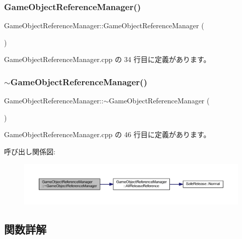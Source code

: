 \subsubsection{\texorpdfstring{Game\+Object\+Reference\+Manager()}{GameObjectReferenceManager()}}
{\footnotesize\ttfamily Game\+Object\+Reference\+Manager\+::\+Game\+Object\+Reference\+Manager (\begin{DoxyParamCaption}{ }\end{DoxyParamCaption})}



 Game\+Object\+Reference\+Manager.\+cpp の 34 行目に定義があります。

\mbox{\label{class_game_object_reference_manager_a9ed62220afb840cdc3e8cbe4bbc3a19e}} 
\subsubsection{\texorpdfstring{$\sim$\+Game\+Object\+Reference\+Manager()}{~GameObjectReferenceManager()}}
{\footnotesize\ttfamily Game\+Object\+Reference\+Manager\+::$\sim$\+Game\+Object\+Reference\+Manager (\begin{DoxyParamCaption}{ }\end{DoxyParamCaption})}



 Game\+Object\+Reference\+Manager.\+cpp の 46 行目に定義があります。

呼び出し関係図\+:\nopagebreak
\begin{figure}[H]
\begin{center}
\leavevmode
\includegraphics[width=350pt]{class_game_object_reference_manager_a9ed62220afb840cdc3e8cbe4bbc3a19e_cgraph}
\end{center}
\end{figure}


\subsection{関数詳解}
\mbox{\label{class_game_object_reference_manager_ac4852ddd6d8bd5e1f13284ba6204e221}} 
